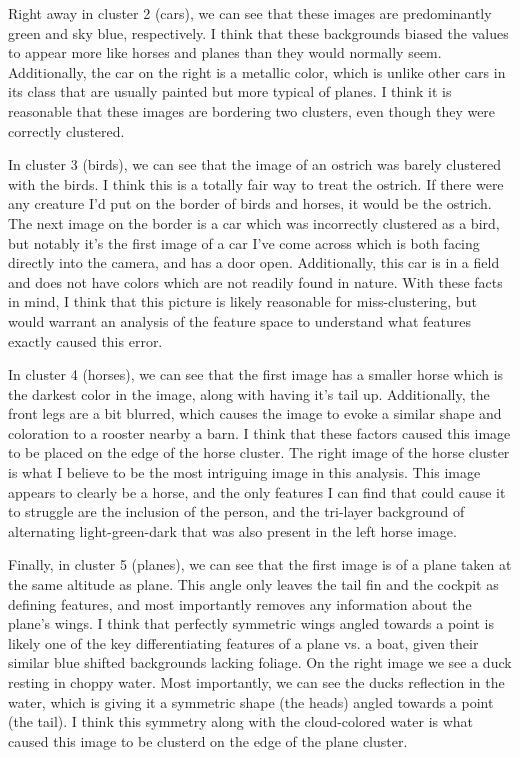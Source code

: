 \documentclass[12pt]{article}
\begin{document}
Right away in cluster 2 (cars), we can see that these images are predominantly green and sky blue, respectively. I think that these
backgrounds biased the values to appear more like horses and planes than they would normally seem. Additionally, the car
on the right is a metallic color, which is unlike other cars in its class that are usually painted but more typical of 
planes. I think it is reasonable that these images are bordering two clusters, even though they were correctly clustered.

In cluster 3 (birds), we can see that the image of an ostrich was barely clustered with the birds. I think this is a 
totally fair way to treat the ostrich. If there were any creature I'd put on the border of birds and horses, it would be 
the ostrich. The next image on the border is a car which was incorrectly clustered as a bird, but notably it's the first 
image of a car I've come across which is both facing directly into the camera, and has a door open. Additionally, this 
car is in a field and does not have colors which are not readily found in nature. With these facts in mind, I think that 
this picture is likely reasonable for miss-clustering, but would warrant an analysis of the feature space to understand
what features exactly caused this error.

In cluster 4 (horses), we can see that the first image has a smaller horse which is the darkest color in the image, along
with having it's tail up. Additionally, the front legs are a bit blurred, which causes the image to evoke a similar shape 
and coloration to a rooster nearby a barn. I think that these factors caused this image to be placed on the edge of the 
horse cluster. The right image of the horse cluster is what I believe to be the most intriguing image in this analysis.
This image appears to clearly be a horse, and the only features I can find that could cause it to struggle are the 
inclusion of the person, and the tri-layer background of alternating light-green-dark that was also present in the left 
horse image. 

Finally, in cluster 5 (planes), we can see that the first image is of a plane taken at the same altitude as plane. This 
angle only leaves the tail fin and the cockpit as defining features, and most importantly removes any information 
about the plane's wings. I think that perfectly symmetric wings angled towards a point is likely one of the key differentiating features of 
a plane vs. a boat, given their similar blue shifted backgrounds lacking foliage. On the right image we see a duck 
resting in choppy water. Most importantly, we can see the ducks reflection in the water, which is giving it a symmetric shape
(the heads) angled towards a point (the tail). I think this symmetry along with the cloud-colored water is what caused this 
image to be clusterd on the edge of the plane cluster.
\end{document}
